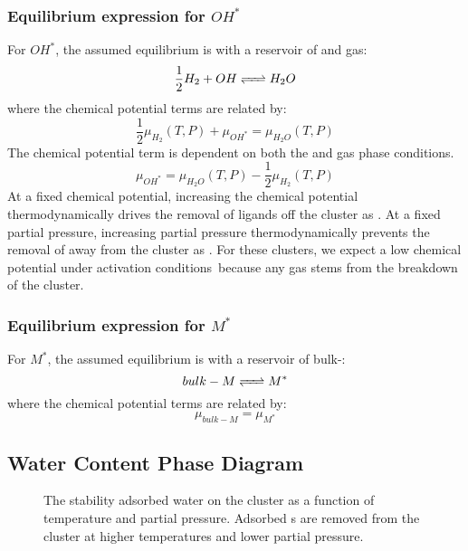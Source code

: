 \documentclass[12pt]{article}
\begin{document}
\subsubsection{Equilibrium expression for $OH^{*}$}
For $OH^{*}$, the assumed equilibrium is with a reservoir of  and  gas:
\begin{equation}
    \frac{1}{2} H_{2} + OH \ce{<=>} H_{2}O
\end{equation}
where the chemical potential terms are related by: 
\begin{equation}
    \frac{1}{2} \mu_{H_{2}}(T,P) + \mu_{OH^{*}} = \mu_{H_{2}O}(T,P) 
\end{equation}
The  chemical potential term is dependent on both the  and  gas phase conditions. 
\begin{equation}
    \mu_{OH^{*}} = \mu_{H_{2}O}(T,P) - \frac{1}{2} \mu_{H_{2}}(T,P)    
\end{equation}
At a fixed  chemical potential, increasing the  chemical potential thermodynamically drives the removal of  ligands off the cluster as . At a fixed  partial pressure, increasing  partial pressure thermodynamically prevents the removal of  away from the cluster as . For these  clusters, we expect a low  chemical potential under activation conditions\ because any  gas stems from the breakdown of the cluster. 

\subsubsection{Equilibrium expression for $M^{*}$}
For $M^{*}$, the assumed equilibrium is with a reservoir of bulk-:
\begin{equation}
    bulk-M \ce{<=>} M^{*}
\end{equation}
where the chemical potential terms are related by: 
\begin{equation}
    \mu_{bulk-M} = \mu_{M^{*}}
\end{equation}


\subsection{Water Content Phase Diagram}
\begin{figure}
    \centering
    \caption{The stability adsorbed water on the  cluster as a function of temperature and  partial pressure. Adsorbed s are removed from the cluster at higher temperatures and lower  partial pressure.}
    \label{fig:h2o-content}
\end{figure}
\end{document}
